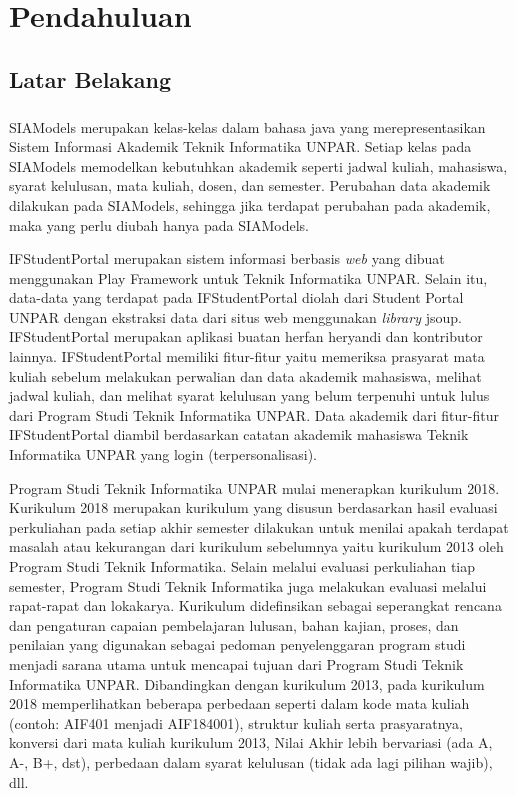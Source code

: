 \chapter{Pendahuluan}
\label{chap:intro}
   
\section{Latar Belakang}
\label{sec:label}

\paragraph{} SIAModels\cite{siamodels} merupakan kelas-kelas dalam bahasa java yang merepresentasikan Sistem Informasi Akademik Teknik Informatika UNPAR. Setiap kelas pada SIAModels memodelkan kebutuhkan akademik seperti jadwal kuliah, mahasiswa, syarat kelulusan, mata kuliah, dosen, dan semester. Perubahan data akademik dilakukan pada SIAModels, sehingga jika terdapat perubahan pada akademik, maka yang perlu diubah hanya pada SIAModels. 

IFStudentPortal\cite{ifstudentportal} merupakan sistem informasi berbasis  \textit{web} yang dibuat menggunakan Play Framework \cite{Leroux:2014} untuk Teknik Informatika UNPAR. Selain itu, data-data yang terdapat pada IFStudentPortal diolah dari Student Portal UNPAR dengan ekstraksi data dari situs web menggunakan \textit{library} jsoup. IFStudentPortal merupakan aplikasi buatan herfan heryandi dan kontributor lainnya\cite{ifstudentportal}. IFStudentPortal memiliki fitur-fitur yaitu memeriksa prasyarat mata kuliah sebelum melakukan perwalian dan data akademik mahasiswa, melihat jadwal kuliah, dan melihat syarat kelulusan yang belum terpenuhi untuk lulus dari Program Studi Teknik Informatika UNPAR. Data akademik dari fitur-fitur IFStudentPortal diambil berdasarkan catatan akademik mahasiswa Teknik Informatika UNPAR yang login (terpersonalisasi).

Program Studi Teknik Informatika UNPAR mulai menerapkan kurikulum 2018. Kurikulum 2018\cite{dokumenkurikulum2018} merupakan kurikulum yang disusun berdasarkan hasil evaluasi  perkuliahan pada setiap akhir semester dilakukan untuk menilai apakah terdapat masalah atau kekurangan dari kurikulum sebelumnya yaitu kurikulum 2013 oleh Program Studi Teknik Informatika. Selain melalui evaluasi perkuliahan tiap semester, Program Studi Teknik Informatika juga melakukan evaluasi melalui rapat-rapat dan lokakarya. Kurikulum didefinsikan sebagai seperangkat rencana dan pengaturan capaian pembelajaran lulusan, bahan kajian, proses, dan penilaian yang digunakan sebagai pedoman penyelenggaran program studi menjadi sarana utama untuk mencapai tujuan dari Program Studi Teknik Informatika UNPAR. Dibandingkan dengan kurikulum 2013, pada kurikulum 2018 memperlihatkan beberapa perbedaan seperti dalam kode mata kuliah (contoh: AIF401 menjadi AIF184001), struktur kuliah serta prasyaratnya, konversi dari mata kuliah kurikulum 2013, Nilai Akhir lebih bervariasi (ada A, A-, B+, dst), perbedaan dalam syarat kelulusan (tidak ada lagi pilihan wajib), dll. 

